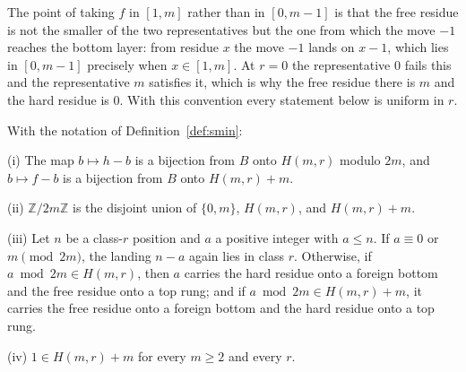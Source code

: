 The point of taking $f$ in $[1, m]$ rather than in $[0, m-1]$ is that the
free residue is not the smaller of the two representatives but the one
from which the move $-1$ reaches the bottom layer: from residue $x$ the
move $-1$ lands on $x - 1$, which lies in $[0, m-1]$ precisely when
$x \in [1, m]$. At $r = 0$ the representative $0$ fails this and the
representative $m$ satisfies it, which is why the free residue there is
$m$ and the hard residue is $0$. With this convention every statement
below is uniform in $r$.

\begin{lemma}[$H$-duality]\label{lem:hduality}
With the notation of Definition~\ref{def:smin}:

(i) The map $b \mapsto h - b$ is a bijection from $B$ onto $H(m,r)$
modulo $2m$, and $b \mapsto f - b$ is a bijection from $B$ onto
$H(m,r) + m$.

(ii) $\mathbb{Z}/2m\mathbb{Z}$ is the disjoint union of $\{0, m\}$,
$H(m,r)$, and $H(m,r) + m$.

(iii) Let $n$ be a class-$r$ position and $a$ a positive integer with
$a \le n$. If $a \equiv 0$ or $m \pmod{2m}$, the landing $n - a$ again
lies in class $r$. Otherwise, if $a \bmod 2m \in H(m,r)$, then $a$
carries the hard residue onto a foreign bottom and the free residue onto
a top rung; and if $a \bmod 2m \in H(m,r) + m$, it carries the free
residue onto a foreign bottom and the hard residue onto a top rung.

(iv) $1 \in H(m,r) + m$ for every $m \ge 2$ and every $r$.
\end{lemma}
